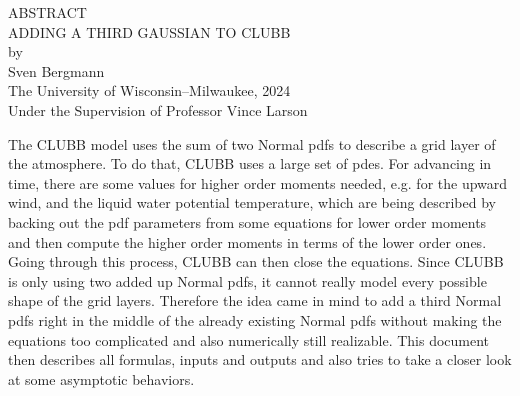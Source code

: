 \begin{center}
    ABSTRACT
    \\
    \singlespacing
    ADDING A THIRD GAUSSIAN TO CLUBB\\
    \doublespacing
    by\\
    Sven Bergmann\\
    \singlespacing
    The University of Wisconsin--Milwaukee, 2024\\
    Under the Supervision of Professor Vince Larson
\end{center}

The \gls{CLUBB} model uses the sum of two Normal \glspl{pdf} to describe a grid layer of the atmosphere.
To do that, \gls{CLUBB} uses a large set of \glspl{pde}.
For advancing in time, there are some values for higher order moments needed, e.g. for the upward wind, and the liquid water potential temperature, which are being described by backing out the \gls{pdf} parameters from some equations for lower order moments and then compute the higher order moments in terms of the lower order ones.
Going through this process, \gls{CLUBB} can then close the equations.
Since \gls{CLUBB} is only using two added up Normal \glspl{pdf}, it cannot really model every possible shape of the grid layers.
Therefore the idea came in mind to add a third Normal \glspl{pdf} right in the middle of the already existing Normal \glspl{pdf} without making the equations too complicated and also numerically still realizable.
This document then describes all formulas, inputs and outputs and also tries to take a closer look at some asymptotic behaviors.
